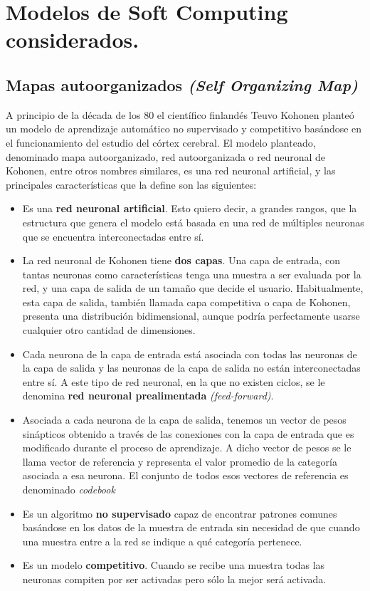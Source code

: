 ﻿\chapter{Modelos de Soft Computing considerados.}
\section{Mapas autoorganizados \textit{(Self Organizing Map)}}
A principio de la década de los 80 el científico finlandés Teuvo Kohonen \cite{kohonensom} planteó un modelo de aprendizaje automático no supervisado y competitivo basándose en el funcionamiento del estudio del córtex cerebral. El modelo planteado, denominado mapa autoorganizado, red autoorganizada o red neuronal de Kohonen, entre otros nombres similares, es una red neuronal artificial, y las principales características que la define son las siguientes:

\begin{itemize}
	\item Es una \textbf{red neuronal artificial}. Esto quiero decir, a grandes rangos, que la estructura que genera el modelo está basada en una red de múltiples neuronas que se encuentra interconectadas entre sí.
	
	\item La red neuronal de Kohonen tiene \textbf{dos capas}. Una capa de entrada, con tantas neuronas como características tenga una muestra a ser evaluada por la red, y una capa de salida de un tamaño que decide el usuario. Habitualmente, esta capa de salida, también llamada capa competitiva o capa de Kohonen, presenta una distribución bidimensional, aunque podría perfectamente usarse cualquier otro cantidad de dimensiones.

	\item Cada neurona de la capa de entrada está asociada con todas las neuronas de la capa de salida y las neuronas de la capa de salida no están interconectadas entre sí. A este tipo de red neuronal, en la que no existen ciclos, se le denomina \textbf{red neuronal prealimentada} \textit{(feed-forward)}.

	\item Asociada a cada neurona de la capa de salida, tenemos un vector de pesos sinápticos obtenido a través de las conexiones con la capa de entrada que es modificado durante el proceso de aprendizaje. A dicho vector de pesos se le llama vector de referencia y representa el valor promedio de la categoría asociada a esa neurona. El conjunto de todos esos vectores de referencia es denominado \textit{codebook}

	\item Es un algoritmo \textbf{no supervisado} capaz de encontrar patrones comunes basándose en los datos de la muestra de entrada sin necesidad de que cuando una muestra entre a la red se indique a qué categoría pertenece.

	\item Es un modelo \textbf{competitivo}. Cuando se recibe una muestra todas las neuronas compiten por ser activadas pero sólo la mejor será activada.
\end{itemize}

